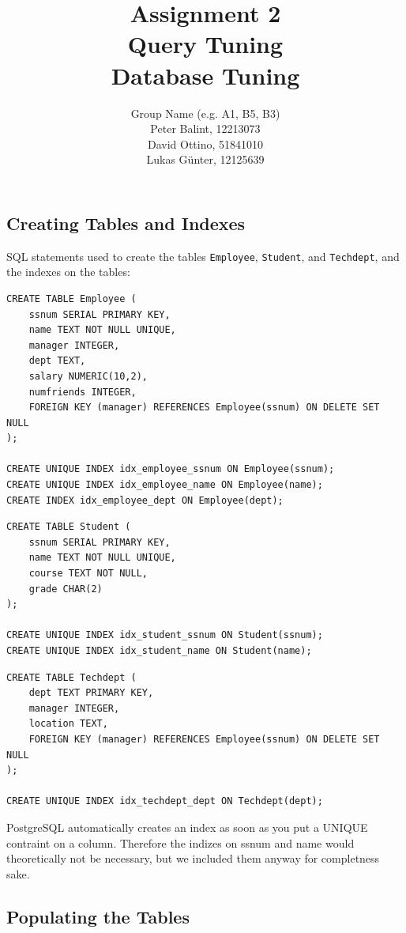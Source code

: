 \documentclass[11pt]{scrartcl}
\title{
  \textbf{\large Assignment 2} \\
  Query Tuning \\
  {\large Database Tuning}
}
\author{
  Group Name (e.g. A1, B5, B3) \\
  \large Peter Balint, 12213073 \\
  \large David Ottino, 51841010 \\
  \large Lukas Günter, 12125639
}
\begin{document}
\maketitle\thispagestyle{empty}

\subsection*{Creating Tables and Indexes}

SQL statements used to create the tables \texttt{Employee}, \texttt{Student}, and \texttt{Techdept}, and the indexes on the tables:

\begin{lstlisting}[style=dbtsql]
CREATE TABLE Employee (
    ssnum SERIAL PRIMARY KEY,
    name TEXT NOT NULL UNIQUE,
    manager INTEGER,
    dept TEXT,
    salary NUMERIC(10,2),
    numfriends INTEGER,
    FOREIGN KEY (manager) REFERENCES Employee(ssnum) ON DELETE SET NULL
);

CREATE UNIQUE INDEX idx_employee_ssnum ON Employee(ssnum);
CREATE UNIQUE INDEX idx_employee_name ON Employee(name);
CREATE INDEX idx_employee_dept ON Employee(dept);
\end{lstlisting}

\begin{lstlisting}[style=dbtsql]
CREATE TABLE Student (
    ssnum SERIAL PRIMARY KEY,
    name TEXT NOT NULL UNIQUE,
    course TEXT NOT NULL,
    grade CHAR(2)
);

CREATE UNIQUE INDEX idx_student_ssnum ON Student(ssnum);
CREATE UNIQUE INDEX idx_student_name ON Student(name);
\end{lstlisting}

\begin{lstlisting}[style=dbtsql]
CREATE TABLE Techdept (
    dept TEXT PRIMARY KEY,
    manager INTEGER,
    location TEXT,
    FOREIGN KEY (manager) REFERENCES Employee(ssnum) ON DELETE SET NULL
);

CREATE UNIQUE INDEX idx_techdept_dept ON Techdept(dept);
\end{lstlisting}

PostgreSQL automatically creates an index as soon as you put a UNIQUE contraint on a column. Therefore the indizes on ssnum and name would theoretically not be necessary, but we included them anyway for completness sake.


\subsection*{Populating the Tables}
\end{document}
